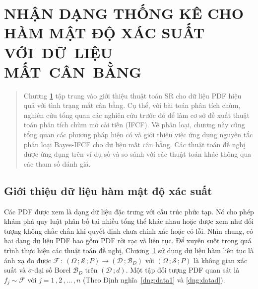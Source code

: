\documentclass[a4paper,oneside]{book} %
\theoremstyle{plain}
\theoremstyle{plain}
\theoremstyle{nonumberplain}
\begin{document}
%
%
















%
\chapter{NHẬN DẠNG THỐNG KÊ CHO HÀM MẬT ĐỘ XÁC SUẤT\\VỚI~DỮ~LIỆU MẤT~CÂN~BẰNG}\label{chapter_2}


\begin{quotation}\fontsize{12pt}{14pt}\selectfont
	Chương \ref{chapter_2} tập trung vào giới thiệu thuật toán SR cho dữ liệu PDF hiệu quả với tình trạng mất cân bằng. Cụ thể, với bài toán phân tích chùm, nghiên cứu tổng quan các nghiên cứu trước đó để làm cơ sở đề xuất thuật toán phân tích chùm mờ cải tiến (IFCF). Về phân loại, chương này cũng tổng quan các phương pháp hiện có và giới thiệu việc ứng dụng nguyên tắc phân loại Bayes-IFCF cho dữ liệu mất cân bằng. Các thuật toán đề nghị được ứng dụng trên ví dụ số và so sánh với các thuật toán khác thông qua các tham số đánh giá.
\end{quotation}

\section{Giới thiệu dữ liệu hàm mật độ xác suất}



Các PDF được xem là dạng dữ liệu đặc trưng với cấu trúc phức tạp. Nó cho phép khám phá quy luật phân bố tại nhiều tổng thể khác nhau hoặc được xem như đối tượng không chắc chắn khi quyết định chưa chính xác hoặc có lỗi. Nhìn chung, có hai dạng dữ liệu PDF bao gồm PDF rời rạc và liên tục. Để xuyên suốt trong quá trình thực hiện các thuật toán đề nghị, Chương~\ref{chapter_2} sử dụng dữ liệu hàm liên tục là ánh xạ đo được $\mathcal{F}\,:\,(\Omega\,; \mathcal{S}\,; P) \to (\mathcal{D}\,;\mathcal{B}_D)$ với $(\Omega\,; \mathcal{S}\,; P)$ là không gian xác suất và  $\sigma$-đại số Borel $\mathcal{B}_D$  trên $(\mathcal{D}\,; d)$. Một tập đối tượng PDF quan sát là $f_j\sim\mathcal{F}$ với $j=1\,,2\,,\ldots\,,n$ (Theo Định nghĩa~\ref{dng:data1} và \ref{dng:datad}). 
\end{document}
